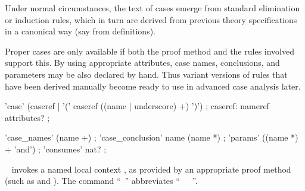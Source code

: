 \begin{isabellebody}
\begin{isamarkuptext}
  Under normal circumstances, the text of cases emerge from standard
  elimination or induction rules, which in turn are derived from
  previous theory specifications in a canonical way (say from
  \hyperlink{command.inductive}{\mbox{}} definitions).

  \medskip Proper cases are only available if both the proof method
  and the rules involved support this.  By using appropriate
  attributes, case names, conclusions, and parameters may be also
  declared by hand.  Thus variant versions of rules that have been
  derived manually become ready to use in advanced case analysis
  later.

  \begin{rail}
    'case' (caseref | '(' caseref ((name | underscore) +) ')')
    ;
    caseref: nameref attributes?
    ;

    'case_names' (name +)
    ;
    'case_conclusion' name (name *)
    ;
    'params' ((name *) + 'and')
    ;
    'consumes' nat?
    ;
  \end{rail}

  \begin{description}
  
  \item \hyperlink{command.case}{\mbox{}}~ invokes a named local
  context , as provided by an
  appropriate proof method (such as \hyperlink{method.cases}{\mbox{}} and
  \hyperlink{method.induct}{\mbox{}}).  The command ``\hyperlink{command.case}{\mbox{}}~'' abbreviates ``\hyperlink{command.fix}{\mbox{}}~~\hyperlink{command.assume}{\mbox{}}~''.


\end{description}
\end{isamarkuptext}
\end{isabellebody}
